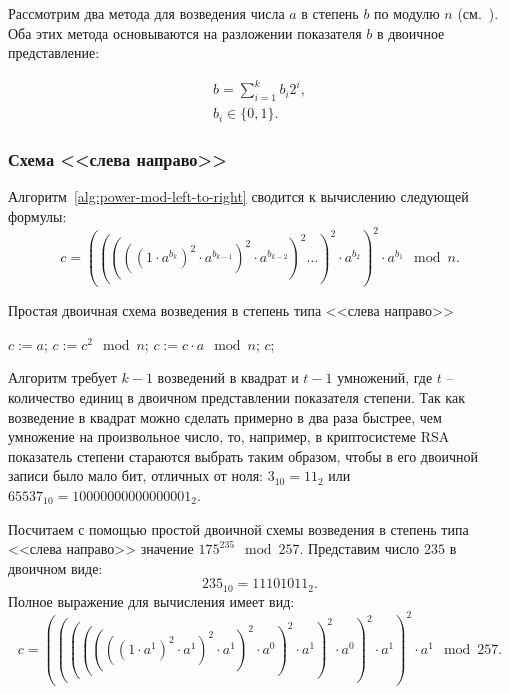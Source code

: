 Рассмотрим два метода для возведения числа $a$ в степень $b$ по модулю $n$ (см.~\cite[9.3.1. Простые двоичные схемы]{Crandall:Pomerance:2011}). Оба этих метода основываются на разложении показателя $b$ в двоичное представление:

\begin{equation}
	\begin{array}{l}
		b = \sum\limits_{i=1}^{k} b_i 2^i, \\
		b_i \in \{0, 1\}.
	\end{array}
	\label{eq:power-mod-b}
\end{equation}

\subsubsection{Схема <<слева направо>>}

Алгоритм~\ref{alg:power-mod-left-to-right} сводится к вычислению следующей формулы:
\[ c = \left( \left( \left( \left( \left( 1 \cdot a^{b_k} \right)^2 \cdot a^{b_{k-1}} \right)^2 \cdot a^{b_{k-2}} \right)^2 \dots \right)^2 \cdot a^{b_2} \right)^2 \cdot a^{b_1} \mod n.\]

\begin{algorithm}[ht]
	\caption{Простая двоичная схема возведения в степень типа <<слева направо>>\label{alg:power-mod-left-to-right}}
	\begin{algorithmic}
		\STATE $c := a$;
			\STATE $c := c^2 \mod n$;
				\STATE $c := c \cdot a \mod n$;
			\ENDIF
		\ENDFOR
		\RETURN $c$;
	\end{algorithmic}
\end{algorithm}

Алгоритм требует $k-1$ возведений в квадрат и $t-1$ умножений, где $t$ -- количество единиц в двоичном представлении показателя степени. Так как возведение в квадрат можно сделать примерно в два раза быстрее, чем умножение на произвольное число, то, например, в криптосистеме RSA показатель степени стараются выбрать таким образом, чтобы в его двоичной записи было мало бит, отличных от ноля: $3_{10} = 11_{2}$ или $65537_{10} = 10000000000000001_{2}$.

\example Посчитаем с помощью простой двоичной схемы возведения в степень типа <<слева направо>> значение $175^{235} \mod 257$. Представим число $235$ в двоичном виде:
\[ 235_{10} = 11101011_{2}.\]
Полное выражение для вычисления имеет вид:
\[ c = (((((((1 \cdot a^1)^2 \cdot a^1)^2 \cdot a^1)^2 \cdot a^0)^2 \cdot a^1)^2 \cdot a^0)^2 \cdot a^1)^2 \cdot a^1 \mod 257.\]

